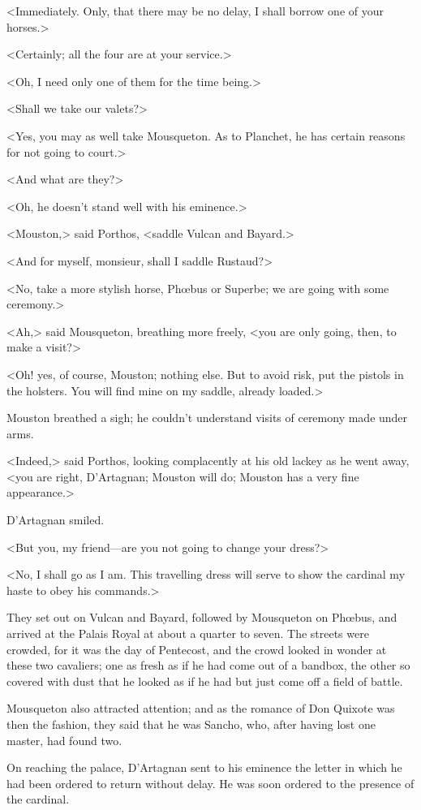 <Immediately. Only, that there may be no delay, I shall borrow one of your horses.>

<Certainly; all the four are at your service.>

<Oh, I need only one of them for the time being.>

<Shall we take our valets?>

<Yes, you may as well take Mousqueton. As to Planchet, he has certain reasons for not going to court.>

<And what are they?>

<Oh, he doesn't stand well with his eminence.>

<Mouston,> said Porthos, <saddle Vulcan and Bayard.>

<And for myself, monsieur, shall I saddle Rustaud?>

<No, take a more stylish horse, Phœbus or Superbe; we are going with some ceremony.>

<Ah,> said Mousqueton, breathing more freely, <you are only going, then, to make a visit?>

<Oh! yes, of course, Mouston; nothing else. But to avoid risk, put the pistols in the holsters. You will find mine on my saddle, already loaded.>

Mouston breathed a sigh; he couldn't understand visits of ceremony made under arms.

<Indeed,> said Porthos, looking complacently at his old lackey as he went away, <you are right, D'Artagnan; Mouston will do; Mouston has a very fine appearance.>

D'Artagnan smiled.

<But you, my friend—are you not going to change your dress?>

<No, I shall go as I am. This travelling dress will serve to show the cardinal my haste to obey his commands.>

They set out on Vulcan and Bayard, followed by Mousqueton on Phœbus, and arrived at the Palais Royal at about a quarter to seven. The streets were crowded, for it was the day of Pentecost, and the crowd looked in wonder at these two cavaliers; one as fresh as if he had come out of a bandbox, the other so covered with dust that he looked as if he had but just come off a field of battle.

Mousqueton also attracted attention; and as the romance of Don Quixote was then the fashion, they said that he was Sancho, who, after having lost one master, had found two.

On reaching the palace, D'Artagnan sent to his eminence the letter in which he had been ordered to return without delay. He was soon ordered to the presence of the cardinal.

